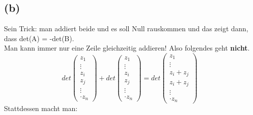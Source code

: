 \documentclass{article} %
\begin{document}
\subsection{(b)}
Sein Trick: man addiert beide und es soll Null rauskommen und das zeigt dann, dass det(A) = -det(B). \\
Man kann immer nur eine Zeile gleichzeitig addieren! Also folgendes geht \textbf{nicht}.
\begin{equation*}
    det \begin{pmatrix}
 z_1 \\
\vdots \\
z_i \\
z_j \\
\vdots \\
 \cdot z_n
\end{pmatrix} + det \begin{pmatrix}
 z_1 \\
\vdots \\
z_i \\
z_j \\
\vdots \\
 \cdot z_n
 \end{pmatrix} = det \begin{pmatrix}
 z_1 \\
\vdots \\
z_i + z_j\\
z_i + z_j \\
\vdots \\
 \cdot z_n
 \end{pmatrix}
\end{equation*}
Stattdessen macht man: 
\end{document}

